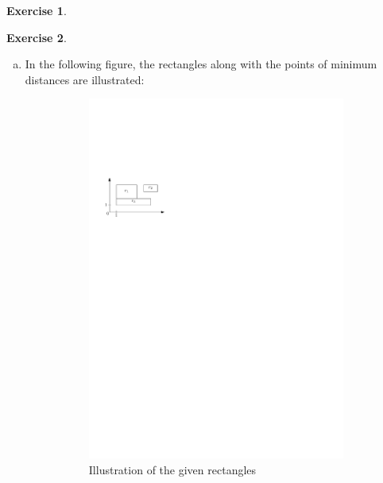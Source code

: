 \documentclass[a4paper,12pt,headsepline]{scrartcl}
\newtheorem{aufgabe}{Exercise}
\begin{document}
\begin{aufgabe}
\end{aufgabe}

\newpage
\begin{aufgabe}
\end{aufgabe}
\begin{enumerate}[a)]
	\item In the following figure, the rectangles along with the points of minimum distances are illustrated:
	\begin{figure}[H]
		\centering
		\begin{subfigure}{0.48\textwidth}
			\centering
			\includegraphics[width=1\linewidth,page=1]{graphics/7_2.pdf}
			\caption*{Illustration of the given rectangles}
		\end{subfigure}
		\begin{subfigure}{0.48\textwidth}
			\centering

\end{subfigure}
\end{figure}
\end{enumerate}
\end{document}
